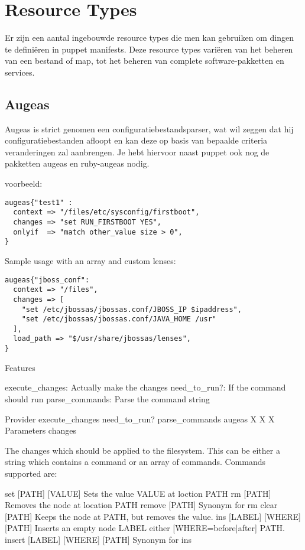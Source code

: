 \chapter{Resource Types}

Er zijn een aantal ingebouwde resource types die men kan gebruiken om dingen te defini\"{e}ren in puppet manifests. Deze resource types vari\"{e}ren van het beheren van een bestand of map, tot het beheren van complete software-pakketten en services.\\

\section{Augeas}
Augeas is strict genomen een configuratiebestandsparser, wat wil zeggen dat hij configuratiebestanden afloopt en kan deze op basis van bepaalde criteria veranderingen zal aanbrengen. Je hebt hiervoor naast puppet ook nog de pakketten augeas en ruby-augeas nodig.

voorbeeld:
\begin{lstlisting}
augeas{"test1" :
  context => "/files/etc/sysconfig/firstboot",
  changes => "set RUN_FIRSTBOOT YES",
  onlyif  => "match other_value size > 0",
}
\end{lstlisting}

Sample usage with an array and custom lenses:

\begin{lstlisting}
augeas{"jboss_conf":
  context => "/files",
  changes => [
    "set /etc/jbossas/jbossas.conf/JBOSS_IP $ipaddress",
    "set /etc/jbossas/jbossas.conf/JAVA_HOME /usr"
  ],
  load_path => "$/usr/share/jbossas/lenses",
}
\end{lstlisting}

Features

    execute\_changes: Actually make the changes
    need\_to\_run?: If the command should run
    parse\_commands: Parse the command string

Provider 	execute\_changes 	need\_to\_run? 	parse\_commands
augeas 	X 	X 	X
Parameters
changes

The changes which should be applied to the filesystem. This can be either a string which contains a command or an array of commands. Commands supported are:

set [PATH] [VALUE]            Sets the value VALUE at loction PATH
rm [PATH]                     Removes the node at location PATH
remove [PATH]                 Synonym for rm
clear [PATH]                  Keeps the node at PATH, but removes the value.
ins [LABEL] [WHERE] [PATH]    Inserts an empty node LABEL either [WHERE={before|after}] PATH.
insert [LABEL] [WHERE] [PATH] Synonym for ins

